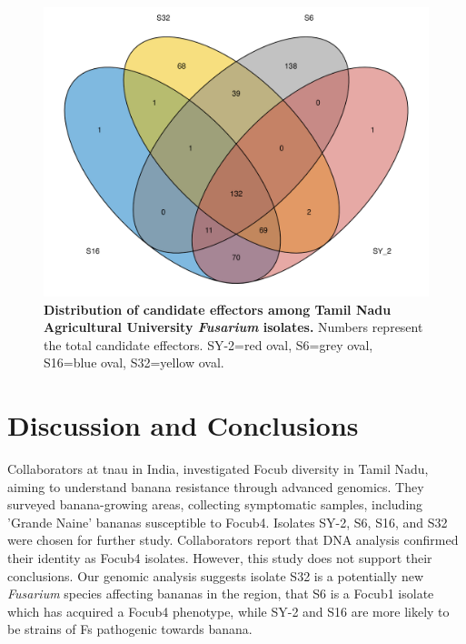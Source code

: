 \begin{figure}[h!]
  \centering
  \includegraphics[width=12cm]{Figures/sharedCandEffsVenn.png}
  \caption[Distribution of candidate effectors among Tamil Nadu Agricultural University \textit{Fusarium} isolates.]{\textbf{Distribution of candidate effectors among Tamil Nadu Agricultural University \textit{Fusarium} isolates.} Numbers represent the total candidate effectors. SY-2=red oval, S6=grey oval, S16=blue oval, S32=yellow oval.}
  \label{fig:TNAUVenn}
\end{figure}

\newpage
\section{Discussion and Conclusions}

Collaborators at \ac{tnau} in India,  investigated \ac{Focub} diversity in Tamil Nadu, aiming to understand banana resistance through advanced genomics. They surveyed banana-growing areas, collecting symptomatic samples, including 'Grande Naine' bananas susceptible to \ac{Focub4}. Isolates SY-2, S6, S16, and S32 were chosen for further study. Collaborators report that DNA analysis confirmed their identity as \ac{Focub4} isolates. However, this study does not support their conclusions. Our genomic analysis suggests isolate S32 is a potentially new \textit{Fusarium} species affecting bananas in the region, that S6 is a \ac{Focub1} isolate which has acquired a \ac{Focub4} phenotype, while SY-2 and S16 are more likely to be strains of \ac{Fs} pathogenic towards banana.

